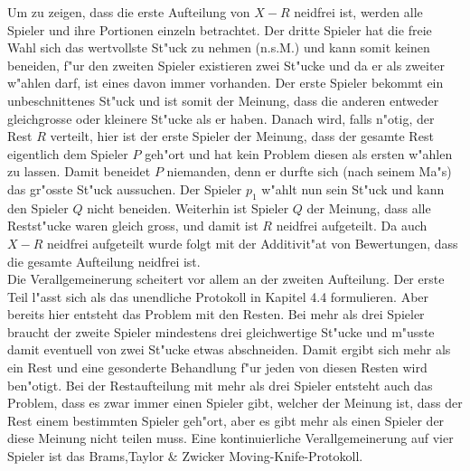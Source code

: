 \documentclass[11pt, a4paper, twoside]{article}
\numberwithin{equation}{section}
\begin{document}
 Um zu zeigen, dass die erste Aufteilung von $X-R$ neidfrei ist, werden alle Spieler und ihre Portionen einzeln betrachtet. Der dritte Spieler hat die freie Wahl sich das wertvollste St"uck zu nehmen (n.s.M.) und kann somit keinen beneiden, f"ur den zweiten Spieler existieren zwei St"ucke und da er als zweiter w"ahlen darf, ist eines davon immer vorhanden. Der erste Spieler bekommt ein unbeschnittenes St"uck und ist somit der Meinung, dass die anderen entweder gleichgrosse oder kleinere St"ucke als er haben. Danach wird, falls n"otig, der Rest $R$ verteilt, hier ist der erste Spieler der Meinung, dass der gesamte Rest eigentlich dem Spieler $P$ geh"ort und hat kein Problem diesen als ersten w"ahlen zu lassen. Damit beneidet $P$ niemanden, denn er durfte sich (nach seinem Ma"s) das gr"osste St"uck aussuchen. Der Spieler $p_1$ w"ahlt nun sein St"uck und kann den Spieler $Q$ nicht beneiden. Weiterhin ist Spieler $Q$ der Meinung, dass alle Restst"ucke waren gleich gross, und damit ist $R$ neidfrei aufgeteilt. Da auch $X-R$ neidfrei aufgeteilt wurde folgt mit der Additivit"at von Bewertungen, dass die gesamte Aufteilung neidfrei ist.\\
Die Verallgemeinerung scheitert vor allem an der zweiten Aufteilung. Der erste Teil l"asst sich als das unendliche Protokoll in Kapitel 4.4 formulieren. Aber bereits hier entsteht das Problem mit den Resten. Bei mehr als drei Spieler braucht der zweite Spieler mindestens drei gleichwertige St"ucke und m"usste damit eventuell von zwei St"ucke etwas abschneiden. Damit ergibt sich mehr als ein Rest und eine gesonderte Behandlung f"ur jeden von diesen Resten wird ben"otigt. Bei der Restaufteilung mit mehr als drei Spieler entsteht auch das Problem, dass es zwar immer einen Spieler gibt, welcher der Meinung ist, dass der Rest einem bestimmten Spieler geh"ort, aber es gibt mehr als einen Spieler der diese Meinung nicht teilen muss. Eine kontinuierliche Verallgemeinerung auf vier Spieler ist das Brams,Taylor \& Zwicker Moving-Knife-Protokoll. 
\end{document}
